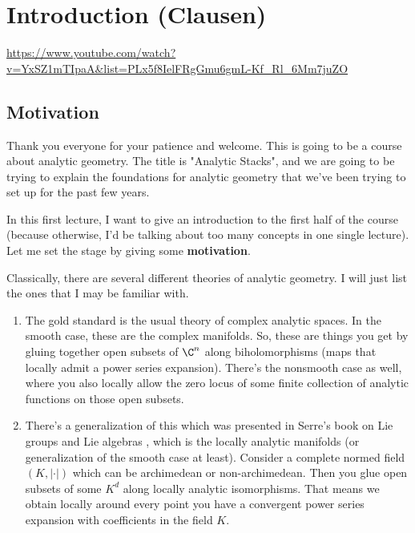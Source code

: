 
\section{\ufs Introduction (Clausen)}

\url{https://www.youtube.com/watch?v=YxSZ1mTIpaA&list=PLx5f8IelFRgGmu6gmL-Kf_Rl_6Mm7juZO}
\renewcommand{\yt}[2]{\href{https://www.youtube.com/watch?v=YxSZ1mTIpaA&list=PLx5f8IelFRgGmu6gmL-Kf_Rl_6Mm7juZO&t=#1}{#2}}
\vspace{1em}



\subsection{Motivation}

Thank you everyone for your patience and welcome. This is going to be a course about analytic geometry. The title is "Analytic 
Stacks", and we are going to be trying to explain the foundations for analytic geometry that we've been trying to 
set up for the past few years. 

In this first lecture, I want to give an introduction to the first half of the course (because otherwise, I'd be talking 
about too many concepts in one single lecture). Let me set the stage by giving some \textbf{motivation}.

Classically, there are several different theories of analytic geometry. I will just list the ones that I may be familiar with. 

\begin{enumerate}
    \item The gold standard is the usual theory of complex analytic spaces. In the smooth case, these are the complex manifolds. 
    So, these are things you get by gluing together open subsets of $\C^n$ along biholomorphisms (maps that locally admit a power series expansion). There's the nonsmooth case as well, where you also locally allow the zero locus of some finite collection of analytic functions on those open subsets.


    \item There's a generalization of this which was presented in Serre's book on Lie groups and Lie algebras \citeme{}, which is 
    the locally analytic manifolds (or generalization of the smooth case at least). Consider a complete normed field $(K, |\cdot|)$
     which can be archimedean or non-archimedean. Then you glue open subsets of some $K^d$ along locally analytic isomorphisms.
      That means we obtain locally around every point you have a convergent power series expansion with coefficients in the field 
      $K$. 
\end{enumerate}
 



